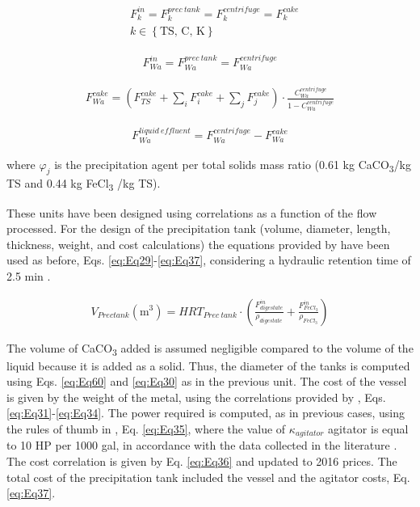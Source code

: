 \begin{refsection}[referencesCh2]
\begin{align}
	& F_k^{in} = F_k^{prec \ tank} = F_k^{centrifuge} = F_k^{cake} \label{eq:Eq56} \\
	& {k} \in \left\{ \text{TS, C, K} \right\} \nonumber
\end{align}

\begin{align}
	F_{Wa}^{in} = F_{Wa}^{prec \ tank} = F_{Wa}^{centrifuge} \label{eq:Eq57}
\end{align}

\begin{align}
	{F}_{Wa}^{cake} = \left( {F}_{TS}^{cake} + \sum\limits_i {F}_i^{cake} + \sum\limits_j {F}_j^{cake} \right) \cdot \frac{C_{Wa}^{centrifuge}}{1 - C_{Wa}^{centrifuge}} \label{eq:Eq58}
\end{align}

\begin{align}
	{F}_{Wa}^{liquid \ effluent} = F_{Wa}^{centrifuge} - {F}_{Wa}^{cake} \label{eq:Eq59}
\end{align}

where $\varphi _{j}$ is the precipitation agent per total solids mass ratio (0.61 kg CaCO\textsubscript{3}/kg TS and 0.44 kg FeCl\textsubscript{3} /kg TS).

These units have been designed using correlations as a function of the flow processed. For the design of the precipitation tank (volume, diameter, length, thickness, weight, and cost calculations) the equations provided by \citet{almena2016technoeconomic} have been used as before, Eqs. \ref{eq:Eq29}-\ref{eq:Eq37}, considering a hydraulic retention time of 2.5 min \citep{szabo2008significance}.

\begin{align}
	{V}_{Prec tank} \left( \text{m}^{3} \right) = HRT_{Prec \ tank} \cdot \left( \frac{F_{digestate}^{in}}{\rho_{digestate}} + \frac{F_{FeCl_{3}}^{in}}{\rho _{FeCl_{3}}} \right) \label{eq:Eq60}
\end{align}

The volume of CaCO\textsubscript{3} added is assumed negligible compared to the volume of the liquid because it is added as a solid. Thus, the diameter of the tanks is computed using Eqs. \ref{eq:Eq60} and \ref{eq:Eq30} as in the previous unit. The cost of the vessel is given by the weight of the metal, using the correlations provided by \citet{almena2016technoeconomic}, Eqs. \ref{eq:Eq31}-\ref{eq:Eq34}. The power required is computed, as in previous cases, using the rules of thumb in \citet{walas1988chemical}, Eq. \ref{eq:Eq35}, where the value of $\kappa_{agitator}$ agitator is equal to 10 HP per 1000 gal, in accordance with the data collected in the literature \citep{walas1988chemical}. The cost correlation is given by Eq. \ref{eq:Eq36} and updated to 2016 prices. The total cost of the precipitation tank included the vessel and the agitator costs, Eq. \ref{eq:Eq37}.


\end{refsection}
